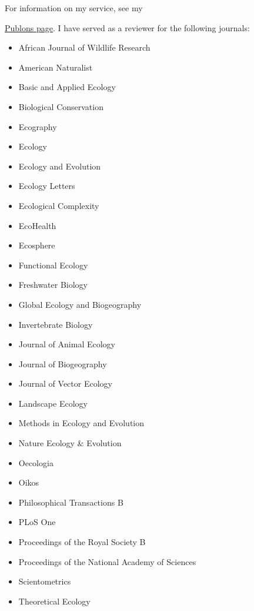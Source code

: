 \documentclass[]{CV}
\begin{document}
For information on my service, see my {\href{https://publons.com/author/904038/tad-dallas#profile}{Publons page}. I have served as a reviewer for the following journals:

\begin{multicols}{2}
\begin{itemize}
 \item African Journal of Wildlife Research
 \item American Naturalist
 \item Basic and Applied Ecology
 \item Biological Conservation
 \item Ecography
 \item Ecology
 \item Ecology and Evolution
 \item Ecology Letters
 \item Ecological Complexity
 \item EcoHealth
 \item Ecosphere
 \item Functional Ecology
 \item Freshwater Biology
 \item Global Ecology and Biogeography
 \item Invertebrate Biology
 \item Journal of Animal Ecology
 \item Journal of Biogeography
 \item Journal of Vector Ecology
 \item Landscape Ecology
 \item Methods in Ecology and Evolution
 \item Nature Ecology \& Evolution
 \item Oecologia
 \item Oikos
 \item Philosophical Transactions B
 \item PLoS One
 \item Proceedings of the Royal Society B
 \item Proceedings of the National Academy of Sciences
 \item Scientometrics
 \item Theoretical Ecology
\end{itemize}
\end{multicols}



}
\end{document}
